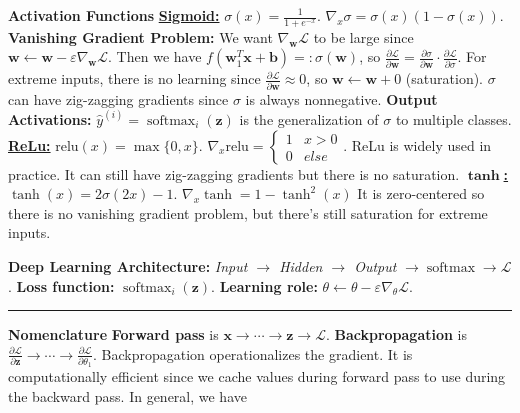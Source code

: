 \documentclass{article}
\newcommand{\x}{\bf{x}}
\newcommand{\w}{\bf{w}}
\newcommand{\z}{\bf{z}}
\renewcommand{\b}{\bf{b}}
\newcommand{\ot}{\leftarrow}
\renewcommand{\bf}[1]{\textbf{{#1}}}
\renewcommand{\it}[1]{\textit{{#1}}}
\newcommand{\pd}[2]{\frac{\partial{#1}}{\partial{#2}}}
\newcommand{\grad}[2]{\nabla_{#1}{#2}}
\newcommand{\ul}[1]{\underline{{#1}}}
\newcommand{\relu}{\text{relu}}
\newcommand{\eps}{\varepsilon}
\renewcommand{\L}{\mathcal{L}}
\DeclareMathOperator*{\sm}{softmax}
\begin{document}
\begin{small}
\bf{Activation Functions}
\newline
\ul{\bf{Sigmoid:}} $\sigma (x) = \frac{1}{1 + e^{-x}}$. $\grad{x}{\sigma} = \sigma(x)(1 - \sigma(x))$.
\newline
\bf{Vanishing Gradient Problem:} We want $\grad{\w}{\L}$ to be large since 
$\w \ot \w - \eps \grad{\w}{\L}$. Then we have $f(\w_1^T \x + \b) =: \sigma(\w)$, so 
$\pd{\L}{\w} = \pd{\sigma}{\w} \cdot \pd{\L}{\sigma}$. For extreme inputs, there is no learning 
since $\pd{\L}{\w} \approx 0$, so $\w \ot \w + 0$ (saturation). $\sigma$ can have zig-zagging 
gradients since $\sigma$ is always nonnegative.
\newline
\bf{Output Activations:} $\hat{y}^{(i)} = \sm_i(\z)$ is the generalization of $\sigma$ to multiple
classes.
\newline
\ul{\bf{ReLu:}} $\relu(x) = \max\{0, x\}$. 
$
\grad{x}{\relu} =
\begin{cases}
    1 & x > 0 \\
    0 & \it{else}
\end{cases}
$. ReLu is widely used in practice. It can still have zig-zagging gradients but there is no
saturation.
\newline
\ul{\bf{$\bm{\tanh}$:}} $\tanh(x) = 2\sigma(2x) - 1$. 
$\grad{x}{\tanh} = 1 - \tanh^2(x)$ It is zero-centered so there is no vanishing
gradient problem, but there's still saturation for extreme inputs.

\newpage
\bf{Deep Learning Architecture:}
\it{Input $\to$ Hidden $\to$ Output} $\to \sm \to \L$. 
\bf{Loss function:} $\sm_i (\z)$.
\bf{Learning role:} $\theta \ot \theta - \eps \grad{\theta}{\L}$.
\hrule
\vspace{0.1em}

\bf{Nomenclature}
\newline
\bf{Forward pass} is $\x \to \cdots \to \z \to \L$. \bf{Backpropagation} is
$\pd{\L}{\z} \to \cdots \to \pd{\L}{\theta_1}$. Backpropagation operationalizes the gradient. It is
computationally efficient since we cache values during forward pass to use during the backward pass.
In general, we have
\vspace{-1em}
\begin{center}
\end{center}
\end{small}
\end{document}
